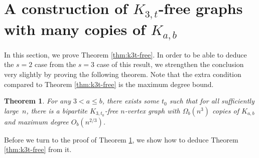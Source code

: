 \documentclass[12pt]{article}
\newtheorem{theorem}{Theorem}[section]
\begin{document}
\section{A construction of $K_{3,t}$-free graphs with many copies of $K_{a,b}$} \label{sec:k3t-free}

In this section, we prove Theorem \ref{thm:k3t-free}. In order to be able to deduce the $s=2$ case from the $s=3$ case of this result, we strengthen the conclusion very slightly by proving the following theorem. Note that the extra condition compared to Theorem \ref{thm:k3t-free} is the maximum degree bound.

\begin{theorem} \label{thm:k3t-free with max degree}
    For any $3<a\leq b$, there exists some $t_0$ such that for all sufficiently large~$n$, there is a bipartite $K_{3,t_0}$-free $n$-vertex graph with $\Omega_b(n^3)$ copies of $K_{a,b}$ and maximum degree $O_b(n^{2/3})$.
\end{theorem}

Before we turn to the proof of Theorem \ref{thm:k3t-free with max degree}, we show how to deduce Theorem \ref{thm:k3t-free} from it.
\end{document}
